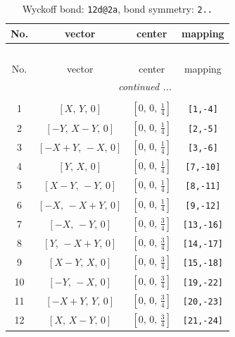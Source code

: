 \documentclass[fleqn,8pt]{jsarticle}
\begin{document}
\begin{longtable}{cccc}
\caption{Wyckoff bond: {\tt 12d@2a}, bond symmetry: {\tt 2..}}
 \\
 \hline \hline
No. & vector & center & mapping \\ \hline \endfirsthead

\multicolumn{3}{l}{\tablename\ \thetable{}} \\
 \hline \hline
No. & vector & center & mapping \\ \hline \endhead

 \hline \hline
\multicolumn{3}{r}{\footnotesize\it continued ...} \\ \endfoot

 \hline \hline
\multicolumn{3}{r}{} \\ \endlastfoot

1 & $\left[ X,\, Y,\, 0 \right]$ & $\left[ 0,\, 0,\, \frac{1}{4} \right]$ & {\tt [1,-4]} \\ \hline
2 & $\left[ - Y,\, X - Y,\, 0 \right]$ & $\left[ 0,\, 0,\, \frac{1}{4} \right]$ & {\tt [2,-5]} \\ \hline
3 & $\left[ - X + Y,\, - X,\, 0 \right]$ & $\left[ 0,\, 0,\, \frac{1}{4} \right]$ & {\tt [3,-6]} \\ \hline
4 & $\left[ Y,\, X,\, 0 \right]$ & $\left[ 0,\, 0,\, \frac{1}{4} \right]$ & {\tt [7,-10]} \\ \hline
5 & $\left[ X - Y,\, - Y,\, 0 \right]$ & $\left[ 0,\, 0,\, \frac{1}{4} \right]$ & {\tt [8,-11]} \\ \hline
6 & $\left[ - X,\, - X + Y,\, 0 \right]$ & $\left[ 0,\, 0,\, \frac{1}{4} \right]$ & {\tt [9,-12]} \\ \hline
7 & $\left[ - X,\, - Y,\, 0 \right]$ & $\left[ 0,\, 0,\, \frac{3}{4} \right]$ & {\tt [13,-16]} \\ \hline
8 & $\left[ Y,\, - X + Y,\, 0 \right]$ & $\left[ 0,\, 0,\, \frac{3}{4} \right]$ & {\tt [14,-17]} \\ \hline
9 & $\left[ X - Y,\, X,\, 0 \right]$ & $\left[ 0,\, 0,\, \frac{3}{4} \right]$ & {\tt [15,-18]} \\ \hline
10 & $\left[ - Y,\, - X,\, 0 \right]$ & $\left[ 0,\, 0,\, \frac{3}{4} \right]$ & {\tt [19,-22]} \\ \hline
11 & $\left[ - X + Y,\, Y,\, 0 \right]$ & $\left[ 0,\, 0,\, \frac{3}{4} \right]$ & {\tt [20,-23]} \\ \hline
12 & $\left[ X,\, X - Y,\, 0 \right]$ & $\left[ 0,\, 0,\, \frac{3}{4} \right]$ & {\tt [21,-24]} \\
\end{longtable}
\end{document}
